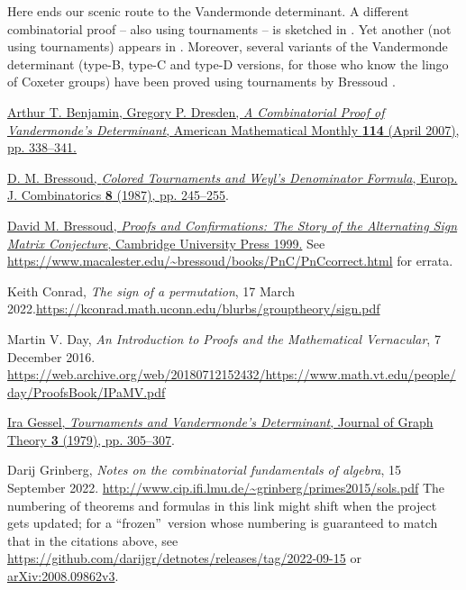 \documentclass[numbers=enddot,12pt,final,onecolumn,notitlepage]{scrartcl}%
\numberwithin{exer}{subsection}
\theoremstyle{definition}
\begin{document}
Here ends our scenic route to the Vandermonde determinant. A different
combinatorial proof -- also using tournaments -- is sketched in
\cite[Exercises 2.4.1--2.4.6]{Bresso99}. Yet another (not using tournaments)
appears in \cite{BenDre07}. Moreover, several variants of the Vandermonde
determinant (type-B, type-C and type-D versions, for those who know the lingo
of Coxeter groups) have been proved using tournaments by Bressoud
\cite{Bresso87}.

\begin{thebibliography}{99999999}                                                                                         %


%
\href{https://scholarship.claremont.edu/hmc_fac_pub/524/}{Arthur T. Benjamin,
Gregory P. Dresden, \textit{A Combinatorial Proof of Vandermonde's
Determinant}, American Mathematical Monthly \textbf{114} (April 2007), pp.
338--341.}

%
\href{https://doi.org/10.1016/S0195-6698(87)80028-8}{D. M. Bressoud,
\textit{Colored Tournaments and Weyl's Denominator Formula}, Europ. J.
Combinatorics \textbf{8} (1987), pp. 245--255}.

%
\href{https://doi.org/10.1017/CBO9780511613449}{David M. Bressoud,
\textit{Proofs and Confirmations: The Story of the Alternating Sign Matrix
Conjecture}, Cambridge University Press 1999.} See
\url{https://www.macalester.edu/~bressoud/books/PnC/PnCcorrect.html} for errata.

Keith Conrad, \textit{The sign of a permutation}, 17
March 2022.\newline\url{https://kconrad.math.uconn.edu/blurbs/grouptheory/sign.pdf}

Martin V. Day, \textit{An Introduction to Proofs and the
Mathematical Vernacular}, 7 December 2016. \newline\url{https://web.archive.org/web/20180712152432/https://www.math.vt.edu/people/day/ProofsBook/IPaMV.pdf}

\href{https://doi.org/10.1002/jgt.3190030315}{Ira
Gessel, \textit{Tournaments and Vandermonde's Determinant}, Journal of Graph
Theory \textbf{3} (1979), pp. 305--307}.

Darij Grinberg, \textit{Notes on the combinatorial
fundamentals of algebra}, 15 September 2022.\newline%
\url{http://www.cip.ifi.lmu.de/~grinberg/primes2015/sols.pdf} \newline The
numbering of theorems and formulas in this link might shift when the project
gets updated; for a \textquotedblleft frozen\textquotedblright\ version whose
numbering is guaranteed to match that in the citations above, see
\url{https://github.com/darijgr/detnotes/releases/tag/2022-09-15} or
\href{https://arxiv.org/abs/2008.09862v3}{arXiv:2008.09862v3}.


\end{thebibliography}
\end{document}
